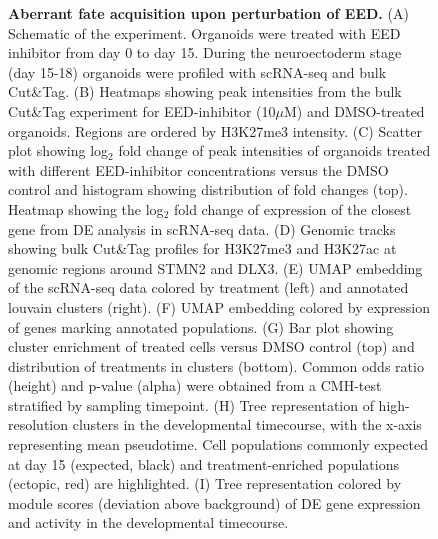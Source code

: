 \begin{figure}[t!]
    \caption{\textbf{Aberrant fate acquisition upon perturbation of EED.}
    (A) Schematic of the experiment. Organoids were treated with EED inhibitor from day 0 to day 15. During the neuroectoderm stage (day 15-18) organoids were profiled with scRNA-seq and bulk Cut\&Tag. (B) Heatmaps showing peak intensities from the bulk Cut\&Tag experiment for EED-inhibitor (10$\mu$M) and DMSO-treated organoids. Regions are ordered by H3K27me3 intensity. (C) Scatter plot showing log$_2$ fold change of peak intensities of organoids treated with different EED-inhibitor concentrations versus the DMSO control and histogram showing distribution of fold changes (top). Heatmap showing the log$_2$ fold change of expression of the closest gene from DE analysis in scRNA-seq data. (D) Genomic tracks showing bulk Cut\&Tag profiles for H3K27me3 and H3K27ac at genomic regions around STMN2 and DLX3. (E) UMAP embedding of the scRNA-seq data colored by treatment (left) and annotated louvain clusters (right). (F) UMAP embedding colored by expression of genes marking annotated populations. (G) Bar plot showing cluster enrichment of treated cells versus DMSO control (top) and distribution of treatments in clusters (bottom). Common odds ratio (height) and p-value (alpha) were obtained from a CMH-test stratified by sampling timepoint. (H) Tree representation of high-resolution clusters in the developmental timecourse, with the x-axis representing mean pseudotime. Cell populations commonly expected at day 15 (expected, black) and treatment-enriched populations (ectopic, red) are highlighted. (I) Tree representation colored by module scores (deviation above background) of DE gene expression and activity in the developmental timecourse.} 
\end{figure}



